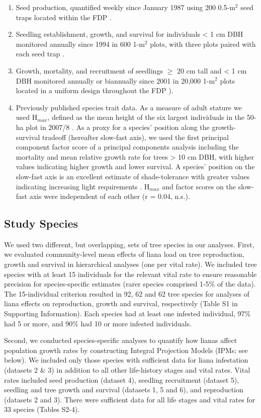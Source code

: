 \documentclass[b5paper,justified]{tufte-book} %
\begin{document}
\begin{fullwidth}
\begin{enumerate}
\item Seed production, quantified weekly since January 1987 using 200 0.5-m$^2$ seed traps located within the FDP \citet{Wright1999}. 
\item Seedling establishment, growth, and survival for individuals < 1 cm DBH monitored annually since 1994 in 600 1-m$^2$ plots, with three plots paired with each seed trap \citep{Wright2005a}. 
\item Growth, mortality, and recruitment of seedlings $\geq$ 20 cm tall and < 1 cm DBH monitored annually or biannually since 2001 in 20,000 1-m$^2$ plots located in a uniform design throughout the FDP \citep{Comita2007}). 
\item Previously published species trait data. As a measure of adult stature we used H$_{max}$, defined as the mean height of the six largest individuals in the 50-ha plot in 2007/8 \citep{Wright2010}. As a proxy for a species' position along the growth-survival tradeoff (hereafter slow-fast axis), we used the first principal component factor score of a principal components analysis including the mortality and mean relative growth rate \citep[obtained from][]{Condit2006} for trees > 10 cm DBH, with higher values indicating higher growth and lower survival.  A species' position on the slow-fast axis is an excellent estimate of shade-tolerance with greater values indicating increasing light requirements \citep{Wright2010}. H$_{max}$ and factor scores on the slow-fast axis were independent of each other (r = 0.04, n.s.).
\end{enumerate}

\subsection{Study Species }
We used two different, but overlapping, sets of tree species in our analyses. First, we evaluated community-level mean effects of liana load on tree reproduction, growth and survival in hierarchical analyses (one per vital rate). We included tree species with at least 15 individuals for the relevant vital rate to ensure reasonable precision for species-specific estimates (rarer species comprised 1-5\% of the data). The 15-individual criterion resulted in 92, 62 and 62 tree species for analyses of liana effects on reproduction, growth and survival, respectively (Table S1 in Supporting Information). Each species had at least one infested individual, 97\% had 5 or more, and 90\% had 10 or more infested individuals. 

Second, we conducted species-specific analyses to quantify how lianas affect population growth rates by constructing Integral Projection Models (IPMs; see below). We included only those species with sufficient data for liana infestation (datasets 2 \& 3) in addition to all other life-history stages and vital rates. Vital rates included seed production (dataset 4), seedling recruitment (dataset 5), seedling and tree growth and survival (datasets 1, 5 and 6), and reproduction (datasets 2 and 3). There were sufficient data for all life stages and vital rates for 33 species (Tables S2-4). 


\end{fullwidth}
\end{document}
